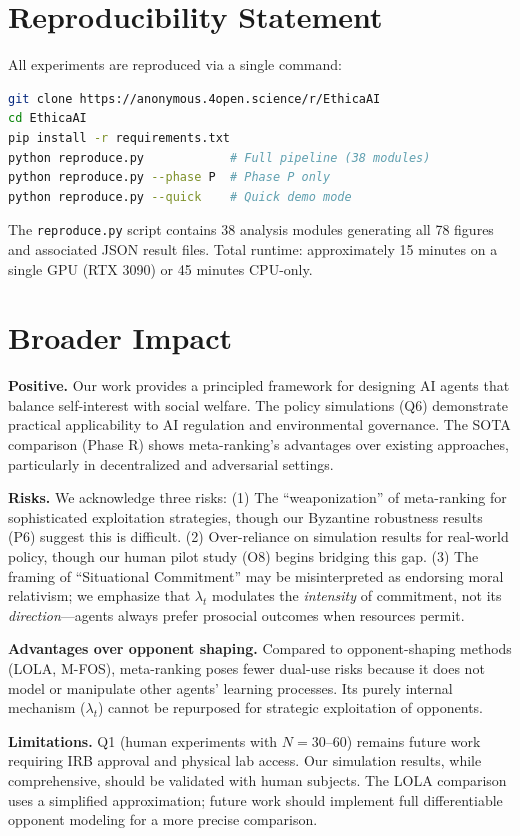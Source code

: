 \documentclass{article}
\begin{document}
\section{Reproducibility Statement}
\label{app:repro}

All experiments are reproduced via a single command:

\begin{lstlisting}[language=bash]
git clone https://anonymous.4open.science/r/EthicaAI
cd EthicaAI
pip install -r requirements.txt
python reproduce.py            # Full pipeline (38 modules)
python reproduce.py --phase P  # Phase P only
python reproduce.py --quick    # Quick demo mode
\end{lstlisting}

The \texttt{reproduce.py} script contains 38 analysis modules generating all 78 figures and associated JSON result files. Total runtime: approximately 15 minutes on a single GPU (RTX 3090) or 45 minutes CPU-only.


\section{Broader Impact}
\label{app:impact}

\textbf{Positive.}
Our work provides a principled framework for designing AI agents that balance self-interest with social welfare. The policy simulations (Q6) demonstrate practical applicability to AI regulation and environmental governance. The SOTA comparison (Phase R) shows meta-ranking's advantages over existing approaches, particularly in decentralized and adversarial settings.

\textbf{Risks.}
We acknowledge three risks:
(1) The ``weaponization'' of meta-ranking for sophisticated exploitation strategies, though our Byzantine robustness results (P6) suggest this is difficult.
(2) Over-reliance on simulation results for real-world policy, though our human pilot study (O8) begins bridging this gap.
(3) The framing of ``Situational Commitment'' may be misinterpreted as endorsing moral relativism; we emphasize that $\lambda_t$ modulates the \textit{intensity} of commitment, not its \textit{direction}---agents always prefer prosocial outcomes when resources permit.

\textbf{Advantages over opponent shaping.}
Compared to opponent-shaping methods (LOLA, M-FOS), meta-ranking poses fewer dual-use risks because it does not model or manipulate other agents' learning processes. Its purely internal mechanism ($\lambda_t$) cannot be repurposed for strategic exploitation of opponents.

\textbf{Limitations.}
Q1 (human experiments with $N{=}30$--60) remains future work requiring IRB approval and physical lab access. Our simulation results, while comprehensive, should be validated with human subjects. The LOLA comparison uses a simplified approximation; future work should implement full differentiable opponent modeling for a more precise comparison.



\end{document}
